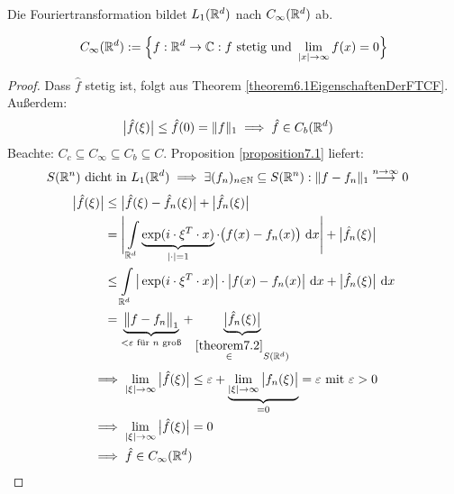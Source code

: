\begin{korollar}\label{korollar7.3RiemanndLebesgue-Lemma}\enter
Die Fouriertransformation bildet $L_1(\mathbb{R}^d)$ nach $C_\infty(\mathbb{R}^d)$ ab.
\end{korollar}

\begin{bemerkung}
\begin{align*}
C_\infty(\mathbb{R}^d):=\Big\lbrace f:\mathbb{R}^d\to\mathbb{C}: f\text{ stetig und }\lim\limits_{|x|\to\infty}f(x)=0\Big\rbrace
\end{align*}
\end{bemerkung}

\begin{proof}
Dass $\hat{f}$ stetig ist, folgt aus Theorem \ref{theorem6.1EigenschaftenDerFTCF}. Außerdem:
\begin{align*}
\big|\hat{f}(\xi)\big|
&\leq\hat{f}(0)=\Vert f\Vert_1\implies\hat{f}\in C_b(\mathbb{R}^d)
\end{align*}
Beachte: $C_c\subseteq C_\infty\subseteq C_b\subseteq C$.
Proposition \ref{proposition7.1} liefert:
\begin{align*}
S(\mathbb{R}^n)&\text{ dicht in }L_1(\mathbb{R}^d)\implies\exists(f_n)_{n\in\mathbb{N}}\subseteq S(\mathbb{R}^n):\Vert f-f_n\Vert_1\stackrel{n\to\infty}{\longrightarrow}0
\end{align*}
\begin{align*}
\big|\hat{f}(\xi)\big|
&\leq\big|\hat{f}(\xi)-\hat{f}_n(\xi)\big|+\big|\hat{f}_n(\xi)\big|\\
&=\Bigg|\int\limits_{\mathbb{R}^d}\underbrace{\exp(i\cdot\xi^T\cdot x)}_{|\cdot|=1}\cdot\big(f(x)-f_n(x)\big)\text{ d} x\Bigg|+\big|\hat{f}_n(\xi)\big|\\
&\leq
\int\limits_{\mathbb{R}^d}\big|\exp(i\cdot\xi^T\cdot x)\big|\cdot\big|f(x)-f_n(x)\big|\text{ d} x+\big|\hat{f}_n(\xi)\big|\text{ d} x\\
&=\underbrace{\big\Vert f-f_n\big\Vert_1}_{<\varepsilon\text{ für $n$ groß}}+\underbrace{\big|\hat{f}_n(\xi)\big|}_{\stackrel{\ref{theorem7.2}}{\in} S(\mathbb{R}^d)}
\end{align*}
\begin{align*}
&\implies
\lim\limits_{|\xi|\to\infty}\big|\hat{f}(\xi)\big|\leq\varepsilon+\underbrace{\lim\limits_{|\xi|\to\infty}\big|f_n(\xi)\big|}_{=0}=\varepsilon\text{ mit }\varepsilon>0\\
&\implies\lim\limits_{|\xi|\to\infty}\big|\hat{f}(\xi)\big|=0\\
&\implies\hat{f}\in C_\infty(\mathbb{R}^d)
\end{align*}
\end{proof}



